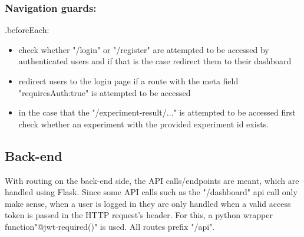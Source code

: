 \subsubsection*{Navigation guards:}
.beforeEach:
\begin{itemize}
    \item check whether "/login" or "/register" are attempted to be accessed by authenticated users and if that is the case redirect them to their dashboard
    \item redirect users to the login page if a route with the meta field "requiresAuth:true" is attempted to be accessed 
    \item in the case that the "/experiment-result/..." is attempted to be accessed first check whether an experiment with the provided experiment id exists.
\end{itemize}

\subsection{Back-end}
With routing on the back-end side, the API calls/endpoints are meant, which are handled using Flask. Since some API calls such as the "/dashboard" api call only make sense, when a user is logged in they are only handled when a valid access token is passed in the HTTP request's header. For this, a python wrapper function"@jwt-required()" is used. All routes prefix "/api".
\label{ssec:routing-back-end}
